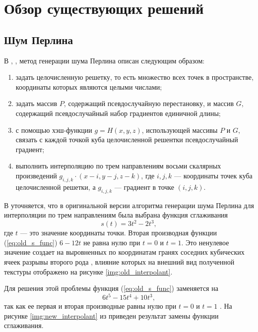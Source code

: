 \chapter{Обзор существующих решений}

\section{Шум Перлина}

В \cite{tandm}, \cite{perlin}, \cite{impperlin} метод генерации шума Перлина описан следующим образом:
\begin{enumerate}
	\item задать целочисленную решетку, то есть множество всех точек в пространстве, координаты которых являются целыми числами;
	\item задать массив $P$, содержащий псевдослучайную перестановку, и массив $G$, содержащий псевдослучайный набор градиентов единичной длины;
	\item с помощью хэш-функции $g = H(x, y, z)$, использующей массивы $P$ и $G$, связать с каждой точкой куба целочисленной решентки псевдослучайный градиент;
	\item выполнить интерполяцию по трем направлениям восьми скалярных произведений $g_{i, j, k} \cdot (x - i, y - j, z - k)$, где $i, j, k$  --- координаты точек куба целочисленной решетки, а $g_{i, j, k}$ --- градиент в точке $(i, j, k)$.
\end{enumerate}

В \cite{impperlin} уточняется, что в оригинальной версии алгоритма генерации шума Перлина для интерполяции по трем направлениям была выбрана функция сглаживания
\begin{equation}
	\label{eq:old_s_func}
	s(t) = 3t^2 - 2t^3,
\end{equation}
где $t$ --- это значение координаты точки. Вторая производная функции (\ref{eq:old_s_func}) $6 - 12t$ не равна нулю при $t = 0$ и $t = 1$. 
Это ненулевое значение создает на выровненных по координатам гранях соседних кубических ячеек разрывы второго рода  \cite{impperlin}, влияние которых на внешний вид полученной текстуры отображено на рисунке \ref{img:old_interpolant}.

Для решения этой проблемы функция (\ref{eq:old_s_func}) заменяется на
\begin{equation}
	\label{eq:new_s_func}
	6t^5 - 15t^4 + 10t^3,
\end{equation}
так как ее первая и вторая производные равны нулю при $t = 0$ и $t = 1$ \cite{impperlin}. 
На рисунке \ref{img:new_interpolant} из \cite{impperlin} приведен результат замены функции сглаживания.

